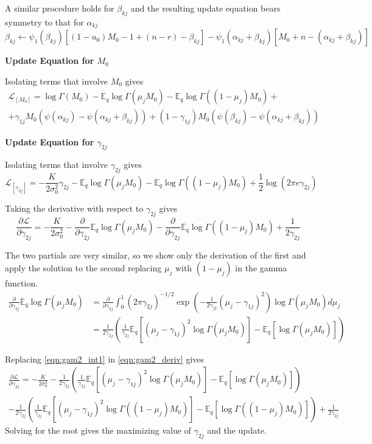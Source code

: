 \documentclass[10pt, letterpaper]{article}
\newcommand{\E}{\mathbb{E}}
\begin{document}
A similar procedure holds for $\beta_{kj}$ and the resulting update equation bears symmetry to that for $\alpha_{kj}$
\begin{equation}
\beta_{kj} \leftarrow \psi_1(\beta_{kj})\left[(1-u_0)M_0-1+(n-r)-\beta_{kj}\right] - \psi_1(\alpha_{kj}+\beta_{kj})\left[M_0+n-(\alpha_{kj}+\beta_{kj})\right]
\end{equation}

{\bf Update Equation for $M_0$ }

Isolating terms that involve $M_0$ gives
\begin{multline}
\mathcal{L}_{[M_0]} = \log \Gamma(M_0) -\E_q\log \Gamma(\mu_jM_0) -\E_q\log \Gamma((1-\mu_j)M_0) +\\
+\gamma_{1j}M_0(\psi(\alpha_{kj})-\psi(\alpha_{kj}+\beta_{kj})) +(1-\gamma_{1j})M_0(\psi(\beta_{kj})-\psi(\alpha_{kj}+\beta_{kj}))
\end{multline}

{\bf Update Equation for $\gamma_{2j}$ }

Isolating terms that involve $\gamma_{2j}$ gives
\begin{equation}
\mathcal{L}_{[\gamma_{2j}]} = -\frac{K}{2\sigma_0^2}\gamma_{2j} -\E_q\log\Gamma(\mu_jM_0) - \E_q\log\Gamma((1-\mu_j)M_0)+\frac{1}{2}\log(2\pi e \gamma_{2j})
\end{equation}

Taking the derivative with respect to $\gamma_{2j}$ gives
\begin{equation}\label{eqn:gam2_deriv}
\frac{\partial \mathcal{L}}{\partial \gamma_{2j}} = -\frac{K}{2\sigma_0^2} -\frac{\partial}{\partial \gamma_{2j}}\E_q\log\Gamma(\mu_jM_0) -\frac{\partial}{\partial \gamma_{2j}}\E_q\log\Gamma((1-\mu_j)M_0) +\frac{1}{2\gamma_{2j}}
\end{equation}

The two partials are very similar, so we show only the derivation of the first and apply the solution to the second replacing $\mu_j$ with $(1-\mu_j)$ in the gamma function.
\begin{align}\label{eqn:gam2_int1}
\frac{\partial}{\partial \gamma_{2j}}\E_q\log\Gamma(\mu_jM_0) &= \frac{\partial}{\partial \gamma_{2j}} \int_0^1 (2\pi\gamma_{2j})^{-1/2}\exp\left(-\frac{1}{2\gamma_{j2}}(\mu_j-\gamma_{1j})^2\right) \log\Gamma(\mu_jM_0)d\mu_j \\
& = \frac{1}{2\gamma_{2j}}\left(\frac{1}{\gamma_{2j}} \E_q \left[ (\mu_j-\gamma_{1j})^2 \log\Gamma(\mu_jM_0) \right] - \E_q \left[ \log\Gamma(\mu_jM_0) \right] \right)
\end{align}

Replacing \eqref{eqn:gam2_int1} in \eqref{eqn:gam2_deriv} gives
\begin{multline}
\frac{\partial \mathcal{L}}{\partial \gamma_{2j}} = -\frac{K}{2\sigma_0^2} 
- \frac{1}{2\gamma_{2j}}\left(\frac{1}{\gamma_{2j}} \E_q \left[ (\mu_j-\gamma_{1j})^2 \log\Gamma(\mu_jM_0) \right] - \E_q \left[ \log\Gamma(\mu_jM_0) \right] \right) \\
- \frac{1}{2\gamma_{2j}}\left(\frac{1}{\gamma_{2j}} \E_q \left[ (\mu_j-\gamma_{1j})^2 \log\Gamma((1-\mu_j)M_0) \right] - \E_q \left[ \log\Gamma((1-\mu_j)M_0) \right] \right) +\frac{1}{2\gamma_{2j}}
\end{multline}
Solving for the root gives the maximizing value of $\gamma_{2j}$ and the update.
\end{document}
